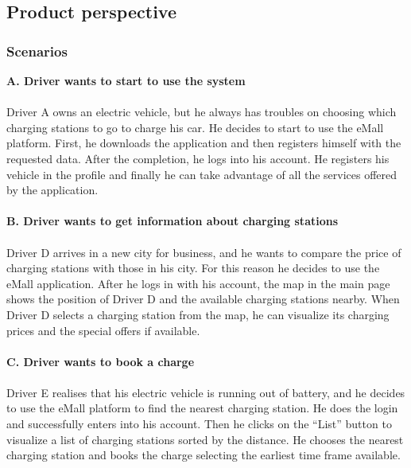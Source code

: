 \documentclass[../main.tex]{subfiles}
\begin{document}
\subsection{Product perspective}

\subsubsection{Scenarios}
\textbf{A. Driver wants to start to use the system}
\vspace{-0.7em}
\\
\\
Driver A owns an electric vehicle, but he always has troubles on choosing which charging stations to go to charge his car. He decides to start to use the eMall platform. First, he downloads the application and then registers himself with the requested data. After the completion, he logs into his account. He registers his vehicle in the profile and finally he can take advantage of all the services offered by the application.
\vspace{2em}
\\
\\
\textbf{B. Driver wants to get information about charging stations}
\vspace{-0.7em}
\\
\\
Driver D arrives in a new city for business, and he wants to compare the price of charging stations with those in his city. For this reason he decides to use the eMall application. After he logs in with his account, the map in the main page shows the position of Driver D and the available charging stations nearby. When Driver D selects a charging station from the map, he can visualize its charging prices and the special offers if available.
\vspace{2em}
\\
\\
\textbf{C. Driver wants to book a charge}
\vspace{-0.7em}
\\
\\
Driver E realises that his electric vehicle is running out of battery, and he decides to use the eMall platform to find the nearest charging station. He does the login and successfully enters into his account. Then he clicks on the “List” button to visualize a list of charging stations sorted by the distance. He chooses the nearest charging station and books the charge selecting the earliest time frame available. 
\end{document}
